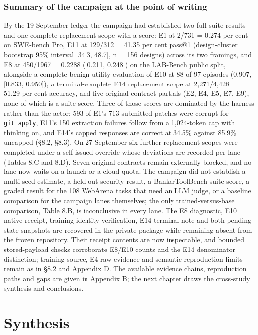 \documentclass[12pt,a4paper]{report}
\begin{document}
\section{Summary of the campaign at the point of
writing}\label{summary-of-the-campaign-at-the-point-of-writing}

By the 19 September ledger the campaign had established two full-suite
results and one complete replacement scope with a score: E1 at 2/731 =
0.274 per cent on SWE-bench Pro, E11 at 129/312 = 41.35 per cent pass@1
(design-cluster bootstrap 95\% interval {[}34.3, 48.7{]}, n = 156
designs) across its two framings, and E8 at 450/1967 = 0.2288 ({[}0.211,
0.248{]}) on the LAB-Bench public split, alongside a complete
benign-utility evaluation of E10 at 88 of 97 episodes (0.907, {[}0.833,
0.950{]}), a terminal-complete E14 replacement scope at 2,271/4,428 =
51.29 per cent accuracy, and five original-contract partials (E2, E4,
E5, E7, E9), none of which is a suite score. Three of those scores are
dominated by the harness rather than the actor: 593 of E1's 713
submitted patches were corrupt for \texttt{git\ apply}, E11's 150
extraction failures follow from a 1,024-token cap with thinking on, and
E14's capped responses are correct at 34.5\% against 85.9\% uncapped
(§8.2, §8.3). On 27 September six further replacement scopes were
completed under a self-issued override whose deviations are recorded per
lane (Tables 8.C and 8.D). Seven original contracts remain externally
blocked, and no lane now waits on a launch or a cloud quota. The
campaign did not establish a multi-seed estimate, a held-out security
result, a BankerToolBench suite score, a graded result for the 108
WebArena tasks that need an LLM judge, or a baseline comparison for the
campaign lanes themselves; the only trained-versus-base comparison,
Table 8.B, is inconclusive in every lane. The E8 diagnostic, E10 native
receipt, training-identity verification, E14 terminal note and both
pending-state snapshots are recovered in the private package while
remaining absent from the frozen repository. Their receipt contents are
now inspectable, and bounded stored-payload checks corroborate E8/E10
counts and the E14 denominator distinction; training-source, E4
raw-evidence and semantic-reproduction limits remain as in §8.2 and
Appendix D. The available evidence chains, reproduction paths and gaps
are given in Appendix B; the next chapter draws the cross-study
synthesis and conclusions.



\part{Synthesis}
\end{document}
